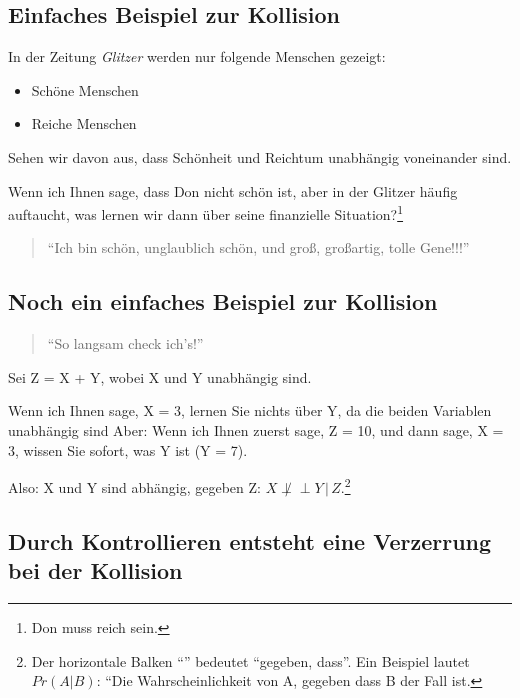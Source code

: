 \documentclass[
  a4paper,
  DIV=11]{scrreprt}
\providecommand{\tightlist}{%
  \setlength{\itemsep}{0pt}\setlength{\parskip}{0pt}}\usepackage{longtable,booktabs,array}
\theoremstyle{definition}
\theoremstyle{remark}
\begin{document}
\hypertarget{einfaches-beispiel-zur-kollision}{%
\subsection{Einfaches Beispiel zur
Kollision}\label{einfaches-beispiel-zur-kollision}}

In der Zeitung \emph{Glitzer} werden nur folgende Menschen gezeigt:

\begin{itemize}
\tightlist
\item
  Schöne Menschen
\item
  Reiche Menschen
\end{itemize}

Sehen wir davon aus, dass Schönheit und Reichtum unabhängig voneinander
sind.

Wenn ich Ihnen sage, dass Don nicht schön ist, aber in der Glitzer
häufig auftaucht, was lernen wir dann über seine finanzielle
Situation?\footnote{Don muss reich sein.}

\begin{quote}
``Ich bin schön, unglaublich schön, und groß, großartig, tolle Gene!!!''
🧑
\end{quote}

\hypertarget{noch-ein-einfaches-beispiel-zur-kollision}{%
\subsection{Noch ein einfaches Beispiel zur
Kollision}\label{noch-ein-einfaches-beispiel-zur-kollision}}

\begin{quote}
``So langsam check ich's!'' 🧑
\end{quote}

Sei Z = X + Y, wobei X und Y unabhängig sind.

Wenn ich Ihnen sage, X = 3, lernen Sie nichts über Y, da die beiden
Variablen unabhängig sind Aber: Wenn ich Ihnen zuerst sage, Z = 10, und
dann sage, X = 3, wissen Sie sofort, was Y ist (Y = 7).

Also: X und Y sind abhängig, gegeben Z:
\(X \not\perp \!\!\! \perp Y \,|\, Z\).\footnote{Der horizontale Balken
  ``\textbar{}'' bedeutet ``gegeben, dass''. Ein Beispiel lautet
  \(Pr(A|B)\): ``Die Wahrscheinlichkeit von A, gegeben dass B der Fall
  ist.}

\hypertarget{durch-kontrollieren-entsteht-eine-verzerrung-bei-der-kollision}{%
\subsection{Durch Kontrollieren entsteht eine Verzerrung bei der
Kollision}\label{durch-kontrollieren-entsteht-eine-verzerrung-bei-der-kollision}}
\end{document}
